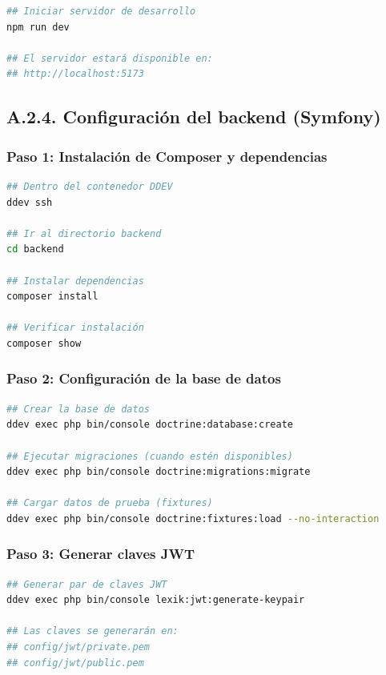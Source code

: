 \documentclass[12pt,a4paper,oneside]{report}
\begin{document}
\begin{lstlisting}[language=bash]
## Iniciar servidor de desarrollo
npm run dev

## El servidor estará disponible en:
## http://localhost:5173
\end{lstlisting}

\subsection{A.2.4. Configuración del backend
(Symfony)}\label{a.2.4.-configuraciuxf3n-del-backend-symfony}

\subsubsection{Paso 1: Instalación de Composer y
dependencias}\label{paso-1-instalaciuxf3n-de-composer-y-dependencias}

\begin{lstlisting}[language=bash]
## Dentro del contenedor DDEV
ddev ssh

## Ir al directorio backend
cd backend

## Instalar dependencias
composer install

## Verificar instalación
composer show
\end{lstlisting}

\subsubsection{Paso 2: Configuración de la base de
datos}\label{paso-2-configuraciuxf3n-de-la-base-de-datos}

\begin{lstlisting}[language=bash]
## Crear la base de datos
ddev exec php bin/console doctrine:database:create

## Ejecutar migraciones (cuando estén disponibles)
ddev exec php bin/console doctrine:migrations:migrate

## Cargar datos de prueba (fixtures)
ddev exec php bin/console doctrine:fixtures:load --no-interaction
\end{lstlisting}

\subsubsection{Paso 3: Generar claves
JWT}\label{paso-3-generar-claves-jwt}

\begin{lstlisting}[language=bash]
## Generar par de claves JWT
ddev exec php bin/console lexik:jwt:generate-keypair

## Las claves se generarán en:
## config/jwt/private.pem
## config/jwt/public.pem
\end{lstlisting}
\end{document}
